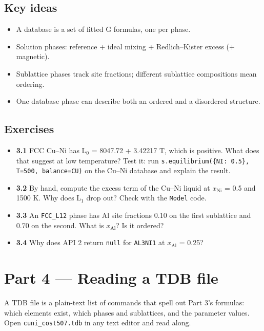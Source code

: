 \documentclass[12pt,a4paper]{article}
\begin{document}
\subsection*{Key ideas}
\begin{itemize}
\item A database is a set of fitted G formulas, one per phase.
\item Solution phases: reference + ideal mixing + Redlich--Kister excess (+ magnetic).
\item Sublattice phases track site fractions; different sublattice compositions mean ordering.
\item One database phase can describe both an ordered and a disordered structure.
\end{itemize}

\subsection*{Exercises}
\begin{itemize}
\item \textbf{3.1} FCC Cu--Ni has L\(_{0}\) = 8047.72 + 3.42217 T, which is positive. What does that suggest at low temperature? Test it: run \texttt{s.\allowbreak{}equilibrium(\{\textquotedbl{}NI\textquotedbl{}: 0.\allowbreak{}5\},\allowbreak{} T=500,\allowbreak{} balance=\textquotedbl{}CU\textquotedbl{})} on the Cu--Ni database and explain the result.
\item \textbf{3.2} By hand, compute the excess term of the Cu--Ni liquid at \(x_{\mathrm{Ni}}\) = 0.5 and 1500 K. Why does L\(_{1}\) drop out? Check with the \texttt{Model} code.
\item \textbf{3.3} An \texttt{FCC\_\allowbreak{}L12} phase has Al site fractions 0.10 on the first sublattice and 0.70 on the second. What is \(x_{\mathrm{Al}}\)? Is it ordered?
\item \textbf{3.4} Why does API 2 return \texttt{null} for \texttt{AL3NI1} at \(x_{\mathrm{Al}}\) = 0.25?
\end{itemize}

\section*{Part 4 --- Reading a TDB file}
A TDB file is a plain-text list of commands that spell out Part 3's formulas: which elements exist, which phases and sublattices, and the parameter values. Open \texttt{cuni\_\allowbreak{}cost507.\allowbreak{}tdb} in any text editor and read along.
\end{document}
